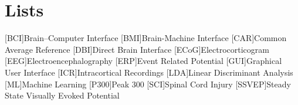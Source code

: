 \appendix
\renewcommand{\appendixtocname}{Appendix}
\renewcommand{\appendixpagename}{\appendixtocname}
\addappheadtotoc
{}
\appendixpage

\chapter{Lists}
\begin{acronym}[\hspace{3cm}]
    [BCI]{Brain–Computer Interface \cite{inbook1}}
    [BMI]{Brain-Machine Interface}
    [CAR]{Common Average Reference \cite{inproceedings1, inproceedings2, article2}}
    [DBI]{Direct Brain Interface}
    [ECoG]{Electrocorticogram \cite{inbook1}}
    [EEG]{Electroencephalography \cite{inbook1}}
    [ERP]{Event Related Potential}
    [GUI]{Graphical User Interface}
    [ICR]{Intracortical Recordings \cite{inbook1}}
    [LDA]{Linear Discriminant Analysis}
    [ML]{Machine Learning \cite{article7}}
    [P300]{Peak 300 \cite{article3}}
    [SCI]{Spinal Cord Injury}
    [SSVEP]{Steady State Visually Evoked Potential
    \cite{article4}}
\end{acronym}
\clearpage


\listoffigures
{}
\clearpage


\listoftables
{}
\clearpage


